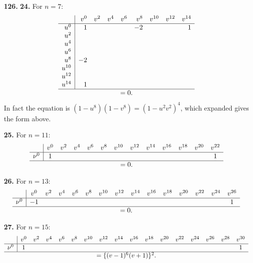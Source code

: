 \documentclass[11pt,a4paper]{article}
\theoremstyle{plain}
\begin{document}
\noindent\textbf{126.} \textbf{24.} For $n = 7$:
\[
\begin{array}{r|rrrrrrrr}
& v^0 & v^2 & v^4 & v^6 & v^8 & v^{10} & v^{12} & v^{14} \\
\hline
u^0 & 1 & & & & -2 & & & 1 \\
u^2 & & & & & & & & \\
u^4 & & & & & & & & \\
u^6 & & & & & & & & \\
u^8 & -2 & & & & & & & \\
u^{10} & & & & & & & & \\
u^{12} & & & & & & & & \\
u^{14} & 1 & & & & & & & \\
\hline
\multicolumn{9}{c}{= 0.}
\end{array}
\]
In fact the equation is $(1 - u^8)(1 - v^8) = (1 - u^2v^2)^4$, which expanded gives the form above.

\medskip
\noindent\textbf{25.} For $n = 11$:
\[
\begin{array}{r|cccccccccccc}
& v^0 & v^2 & v^4 & v^6 & v^8 & v^{10} & v^{12} & v^{14} & v^{16} & v^{18} & v^{20} & v^{22} \\
\hline
\nu^0 & 1 & & & & & & & & & & & 1 \\
\hline
\multicolumn{13}{c}{= 0.}
\end{array}
\]

\medskip
\noindent\textbf{26.} For $n = 13$:
\[
\begin{array}{r|cccccccccccccc}
& v^0 & v^2 & v^4 & v^6 & v^8 & v^{10} & v^{12} & v^{14} & v^{16} & v^{18} & v^{20} & v^{22} & v^{24} & v^{26} \\
\hline
\nu^0 & -1 & & & & & & & & & & & & & 1 \\
\hline
\multicolumn{15}{c}{= 0.}
\end{array}
\]

\medskip
\noindent\textbf{27.} For $n = 15$:
\[
\begin{array}{r|cccccccccccccccc}
& v^0 & v^2 & v^4 & v^6 & v^8 & v^{10} & v^{12} & v^{14} & v^{16} & v^{18} & v^{20} & v^{22} & v^{24} & v^{26} & v^{28} & v^{30} \\
\hline
\nu^0 & 1 & & & & & & & & & & & & & & & 1 \\
\hline
\multicolumn{17}{c}{= \{(v - 1)^6(v + 1)\}^2.}
\end{array}
\]
\end{document}
